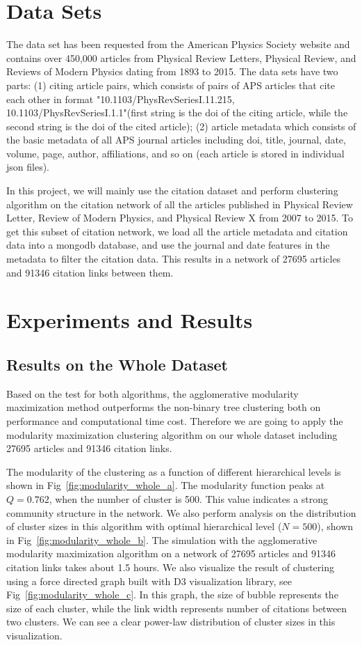 \documentclass{article} %
\begin{document}
\section{Data Sets}
\label{data}
The data set has been requested from the American Physics Society website and contains over 450,000 articles from Physical Review Letters, Physical Review, and Reviews of Modern Physics dating from 1893 to 2015. The data sets have two parts:
(1) citing article pairs, which consists of pairs of APS articles that cite each other in format "10.1103/PhysRevSeriesI.11.215, 10.1103/PhysRevSeriesI.1.1"(first string is the doi of the citing article, while the second string is the doi of the cited article); (2) article metadata which consists of the basic metadata of all APS journal articles including doi, title, journal, date, volume, page, author, affiliations, and so on (each article is stored in individual json files).

In this project, we will mainly use the citation dataset and perform clustering algorithm on the citation network of all the articles published in Physical Review Letter, Review of Modern Physics, and Physical Review X from 2007 to 2015. To get this subset of citation network, we load all the article metadata and citation data into a mongodb database, and use the journal and date features in the metadata to filter the citation data. This results in a network of 27695 articles and 91346 citation links between them.

\section{Experiments and Results}

\subsection{Results on the Whole Dataset}

Based on the test for both algorithms, the agglomerative modularity maximization method outperforms the non-binary tree clustering both on performance and computational time cost. Therefore we are going to apply the modularity maximization clustering algorithm on our whole dataset including 27695 articles and 91346 citation links. 

The modularity of the clustering as a function of different hierarchical levels is shown in Fig~\ref{fig:modularity_whole_a}. The modularity function peaks at $Q=0.762$, when the number of cluster is 500. This value indicates a strong community structure in the network. We also perform analysis on the distribution of cluster sizes in this algorithm with optimal hierarchical level ($N=500$), shown in Fig~\ref{fig:modularity_whole_b}. The simulation with the agglomerative modularity maximization algorithm on a network of 27695 articles and 91346 citation links takes about 1.5 hours. We also visualize the result of clustering using a force directed graph built with D3 visualization library, see Fig~\ref{fig:modularity_whole_c}. In this graph, the size of bubble represents the size of each cluster, while the link width represents number of citations between two clusters. We can see a clear power-law distribution of cluster sizes in this visualization.
\end{document}
